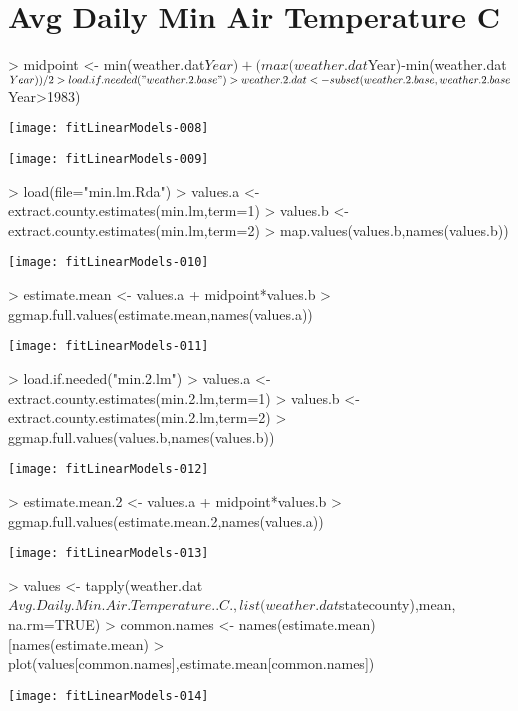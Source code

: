 \documentclass{report}
\begin{document}
\section{Avg Daily Min Air Temperature C}

\begin{Schunk}
\begin{Sinput}
> midpoint <- min(weather.dat$Year) + (max(weather.dat$Year)-min(weather.dat$Year))/2
> load.if.needed("weather.2.base")
> weather.2.dat <- subset(weather.2.base,weather.2.base$Year>1983)
\end{Sinput}
\end{Schunk}

\texttt{[image: fitLinearModels-008]}

\texttt{[image: fitLinearModels-009]}

\begin{Schunk}
\begin{Sinput}
> load(file="min.lm.Rda")
> values.a <- extract.county.estimates(min.lm,term=1)
> values.b <- extract.county.estimates(min.lm,term=2)
> map.values(values.b,names(values.b))
\end{Sinput}
\end{Schunk}
\texttt{[image: fitLinearModels-010]}

\begin{Schunk}
\begin{Sinput}
> estimate.mean <- values.a + midpoint*values.b
> ggmap.full.values(estimate.mean,names(values.a))
\end{Sinput}
\end{Schunk}
\texttt{[image: fitLinearModels-011]}

\begin{Schunk}
\begin{Sinput}
> load.if.needed("min.2.lm")
> values.a <- extract.county.estimates(min.2.lm,term=1)
> values.b <- extract.county.estimates(min.2.lm,term=2)
> ggmap.full.values(values.b,names(values.b))
\end{Sinput}
\end{Schunk}
\texttt{[image: fitLinearModels-012]}

\begin{Schunk}
\begin{Sinput}
> estimate.mean.2 <- values.a + midpoint*values.b
> ggmap.full.values(estimate.mean.2,names(values.a))
\end{Sinput}
\end{Schunk}
\texttt{[image: fitLinearModels-013]}

\begin{Schunk}
\begin{Sinput}
> values <- tapply(weather.dat$Avg.Daily.Min.Air.Temperature..C.,list(weather.dat$statecounty),mean, na.rm=TRUE)
> common.names <- names(estimate.mean)[names(estimate.mean)%in%names(values)]
> plot(values[common.names],estimate.mean[common.names])
\end{Sinput}
\end{Schunk}
\texttt{[image: fitLinearModels-014]}
\end{document}
